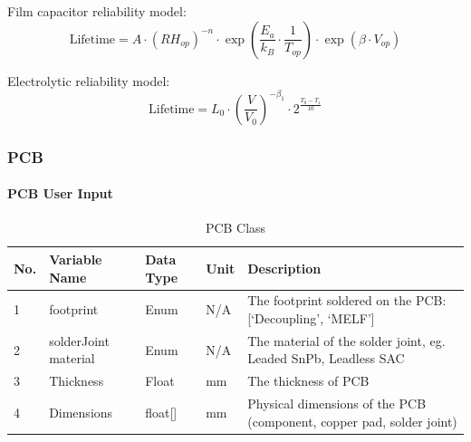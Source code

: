 \documentclass{article}
\begin{document}
Film capacitor reliability model:
\begin{equation}
\text{Lifetime} = A \cdot (RH_{op})^{-n} \cdot \exp\left(\frac{E_a}{k_B} \cdot \frac{1}{T_{op}}\right) \cdot \exp(\beta \cdot V_{op})
\end{equation}

Electrolytic reliability model:
\begin{equation}
\text{Lifetime} = L_0 \cdot \left(\frac{V}{V_0}\right)^{-\beta_1} \cdot 2^{\frac{T_0 - T_1}{10}}
\end{equation}

\subsubsection{PCB}
\paragraph{PCB User Input}
\begin{table}[h]
\centering
\caption{PCB Class}
\begin{tabular}{|l|l|l|l|p{6cm}|}
\hline
\textbf{No.} & \textbf{Variable Name} & \textbf{Data Type} & \textbf{Unit} & \textbf{Description} \\ \hline
1 & footprint & Enum & N/A & The footprint soldered on the PCB: [`Decoupling', `MELF'] \\ \hline
2 & solderJoint material & Enum & N/A & The material of the solder joint, eg. Leaded SnPb, Leadless SAC \\ \hline
3 & Thickness & Float & mm & The thickness of PCB \\ \hline
4 & Dimensions & float[] & mm & Physical dimensions of the PCB (component, copper pad, solder joint) \\ \hline
\end{tabular}
\end{table}
\end{document}
